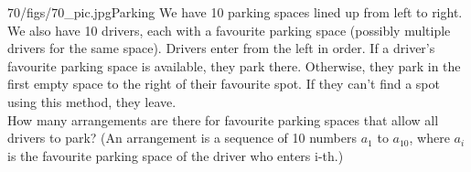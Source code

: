 \begin{problem}{70/figs/70_pic.jpg}{Parking} We have 10 parking spaces lined up from left to right. We also have 10 drivers, each with a favourite parking space (possibly multiple drivers for the same space). Drivers enter from the left in order. If a driver's favourite parking space is available, they park there. Otherwise, they park in the first empty space to the right of their favourite spot. If they can't find a spot using this method, they leave.\\[0.2cm]
	
How many arrangements are there for favourite parking spaces that allow all drivers to park? (An arrangement is a sequence of 10 numbers $a_1$ to $a_{10}$, where $a_i$ is the favourite parking space of the driver who enters i-th.)
\end{problem}
